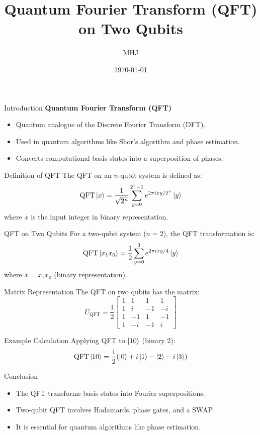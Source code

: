 \documentclass{beamer}
\title{Quantum Fourier Transform (QFT) on Two Qubits}
\author{MHJ}
\date{\today}
\begin{document}
\begin{frame}
   \titlepage
\end{frame}

\begin{frame}{Introduction}
   \textbf{Quantum Fourier Transform (QFT)}
   \begin{itemize}
       \item Quantum analogue of the Discrete Fourier Transform (DFT).
       \item Used in quantum algorithms like Shor's algorithm and phase estimation.
       \item Converts computational basis states into a superposition of phases.
   \end{itemize}
\end{frame}

\begin{frame}{Definition of QFT}
   The QFT on an \( n \)-qubit system is defined as:
   \[
   \text{QFT} \ket{x} = \frac{1}{\sqrt{2^n}} \sum_{y=0}^{2^n-1} e^{2\pi i xy / 2^n} \ket{y}
   \]
   where \( x \) is the input integer in binary representation.
\end{frame}

\begin{frame}{QFT on Two Qubits}
   For a two-qubit system (\( n=2 \)), the QFT transformation is:
   \[
   \text{QFT} \ket{x_1 x_0} = \frac{1}{2} \sum_{y=0}^{3} e^{2\pi i x y / 4} \ket{y}
   \]
   where \( x = x_1 x_0 \) (binary representation).
\end{frame}



\begin{frame}{Matrix Representation}
   The QFT on two qubits has the matrix:
   \[
   U_{\text{QFT}} = \frac{1}{2}
   \begin{bmatrix}
       1 & 1 & 1 & 1 \\
       1 & i & -1 & -i \\
       1 & -1 & 1 & -1 \\
       1 & -i & -1 & i
   \end{bmatrix}
   \]
\end{frame}

\begin{frame}{Example Calculation}
   Applying QFT to \( \ket{10} \) (binary 2):
   \[
   \text{QFT} \ket{10} = \frac{1}{2} (\ket{0} + i\ket{1} - \ket{2} - i\ket{3})
   \]
\end{frame}

\begin{frame}{Conclusion}
   \begin{itemize}
       \item The QFT transforms basis states into Fourier superpositions.
       \item Two-qubit QFT involves Hadamards, phase gates, and a SWAP.
       \item It is essential for quantum algorithms like phase estimation.
   \end{itemize}
\end{frame}
\end{document}
